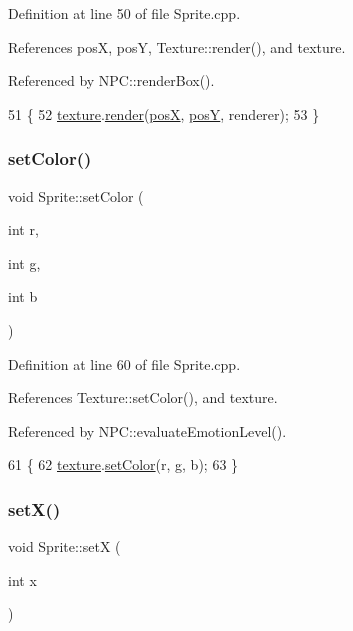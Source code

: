 Definition at line 50 of file Sprite.\+cpp.



References posX, posY, Texture\+::render(), and texture.



Referenced by N\+P\+C\+::render\+Box().


\begin{DoxyCode}
51 \{
52     \hyperlink{class_sprite_aa4978b284ebaae7225869d238dcb32cb}{texture}.\hyperlink{class_texture_ac91a5257c451c80ffbf9a3d1485ba1c8}{render}(\hyperlink{class_sprite_a0af496e3e6540f1f1321913a741a737a}{posX}, \hyperlink{class_sprite_a1ef80a5eff9d5b0bb90ae355daf09efe}{posY}, renderer);
53 \}
\end{DoxyCode}
\mbox{\label{class_sprite_a1ca0939610f24386a4eecb8e91688c65}} 
\subsubsection{\texorpdfstring{set\+Color()}{setColor()}}
{\footnotesize\ttfamily void Sprite\+::set\+Color (\begin{DoxyParamCaption}\item[{int}]{r,  }\item[{int}]{g,  }\item[{int}]{b }\end{DoxyParamCaption})}



Definition at line 60 of file Sprite.\+cpp.



References Texture\+::set\+Color(), and texture.



Referenced by N\+P\+C\+::evaluate\+Emotion\+Level().


\begin{DoxyCode}
61 \{
62     \hyperlink{class_sprite_aa4978b284ebaae7225869d238dcb32cb}{texture}.\hyperlink{class_texture_ab3149eb648f437a09dc0938942c2c4ce}{setColor}(r, g, b);
63 \}
\end{DoxyCode}
\mbox{\label{class_sprite_ae21322c28b8719af996990fafa920762}} 
\subsubsection{\texorpdfstring{set\+X()}{setX()}}
{\footnotesize\ttfamily void Sprite\+::setX (\begin{DoxyParamCaption}\item[{int}]{x }\end{DoxyParamCaption})}



